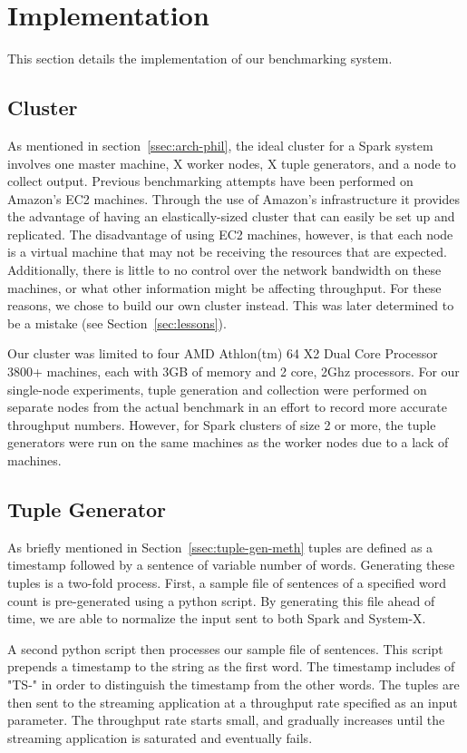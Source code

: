 \section{Implementation}
This section details the implementation of our benchmarking system.
\subsection{Cluster}
As mentioned in section~\ref{ssec:arch-phil}, the ideal cluster for a Spark system involves one master machine, X worker nodes, X tuple generators, and a node to collect output.  Previous benchmarking attempts have been performed on Amazon's EC2 machines.  Through the use of Amazon's infrastructure it provides the advantage of having an elastically-sized cluster that can easily be set up and replicated.  The disadvantage of using EC2 machines, however, is that each node is a virtual machine that may not be receiving the resources that are expected.  Additionally, there is little to no control over the network bandwidth on these machines, or what other information might be affecting throughput.  For these reasons, we chose to build our own cluster instead.  This was later determined to be a mistake (see Section~\ref{sec:lessons}).

Our cluster was limited to four AMD Athlon(tm) 64 X2 Dual Core Processor 3800+ machines, each with 3GB of memory and 2 core, 2Ghz processors.  For our single-node experiments, tuple generation and collection were performed on separate nodes from the actual benchmark in an effort to record more accurate throughput numbers.  However, for Spark clusters of size 2 or more, the tuple generators were run on the same machines as the worker nodes due to a lack of machines.

\subsection{Tuple Generator}
As briefly mentioned in Section~\ref{ssec:tuple-gen-meth} tuples are defined as a timestamp followed by a sentence of variable number of words.  Generating these tuples is a two-fold process.  First, a sample file of sentences of a specified word count is pre-generated using a python script.  By generating this file ahead of time, we are able to normalize the input sent to both Spark and System-X.

A second python script then processes our sample file of sentences.  This script prepends a timestamp to the string as the first word.  The timestamp includes of "TS-" in order to distinguish the timestamp from the other words.  The tuples are then sent to the streaming application at a throughput rate specified as an input parameter.  The throughput rate starts small, and gradually increases until the streaming application is saturated and eventually fails.

